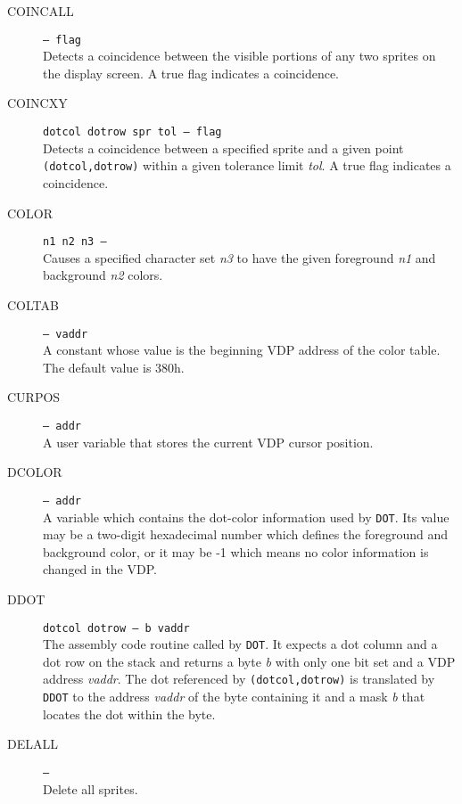 \documentclass{article}
\begin{document}
\begin{multicols}{2}[]
\begin{description}
			\item[COINCALL]\texttt{--- flag }\\
				Detects a coincidence between the visible portions of any two sprites
				on the display screen. A true flag indicates a coincidence.

			\item[COINCXY]\texttt{dotcol dotrow spr tol --- flag }\\
				Detects a coincidence between a specified sprite and a given point
				\verb|(dotcol,dotrow)| within a given tolerance limit \textit{tol}.
				A true flag indicates a coincidence.

			\item[COLOR]\texttt{n1 n2 n3 --- }\\
				Causes a specified character set \textit{n3} to have the given
				foreground \textit{n1} and background \textit{n2} colors.

			\item[COLTAB]\texttt{--- vaddr }\\
				A constant whose value is the beginning VDP address of the color
				table. The default value is 380h.

			\item[CURPOS]\texttt{--- addr }\\
				A user variable that stores the current VDP cursor position.

			\item[DCOLOR]\texttt{--- addr }\\
				A variable which contains the dot-color information used by \verb|DOT|.
				Its value may be a two-digit hexadecimal number which defines the
				foreground and background color, or it may be -1 which means no
				color information is changed in the VDP.

			\item[DDOT]\texttt{dotcol dotrow --- b vaddr }\\
				The assembly code routine called by \verb|DOT|. It expects a dot
				column and a dot row on the stack and returns a byte \textit{b} with
				only one bit set and a VDP address \textit{vaddr}. The dot referenced
				by \verb|(dotcol,dotrow)| is translated by \verb|DDOT| to the address
				\textit{vaddr} of the byte containing it and a mask \textit{b} that 
				locates the dot within the byte.

			\item[DELALL]\texttt{--- }\\
				Delete all sprites.


\end{description}
\end{multicols}
\end{document}
